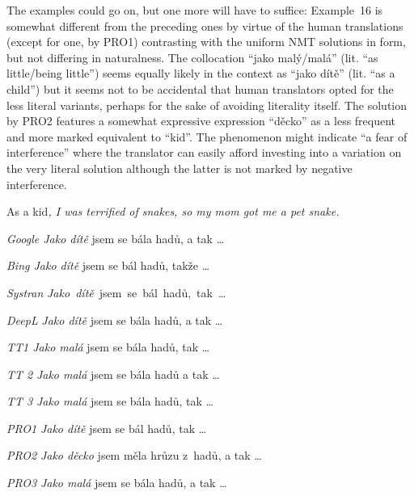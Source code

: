 \documentclass[output=paper]{langscibook}
\begin{document}
\z
The examples could go on, but one more will have to suffice: Example~16 is somewhat different from the preceding ones by virtue of the human translations (except for one, by PRO1) contrasting with the uniform NMT solutions in form, but not differing in naturalness. The collocation “jako malý/malá” (lit. “as little/being little”) seems equally likely in the context as “jako dítě” (lit. “as a child”) but it seems not to be accidental that human translators opted for the less literal variants, perhaps for the sake of avoiding literality itself. The solution by PRO2 features a somewhat expressive expression “děcko” as a less frequent and more marked equivalent to “kid”. The phenomenon might indicate “a fear of interference” where the translator can easily afford investing into a variation on the very literal solution although the latter is not marked by negative interference.

\ea \label{ex:kamenicka:12}

As a kid\textit{, I was terrified of snakes, so my mom got me a pet snake.}

\textit{Google Jako dítě} jsem se bála hadů, a tak …

\textit{Bing Jako dítě} jsem se bál hadů, takže …

\textit{Systran} \textit{Jako~dítě}~jsem~se~bál~hadů,~tak~…

\textit{DeepL} \textit{Jako dítě} jsem se bála hadů, a tak …

\textit{TT1 Jako malá} jsem se bála hadů, tak …

\textit{TT 2} \textit{Jako malá} jsem se bála hadů a tak …

\textit{TT 3} \textit{Jako malá} jsem se bála hadů, tak …

\textit{PRO1} \textit{Jako dítě} jsem se bál hadů, tak …

\textit{PRO2} \textit{Jako děcko} jsem měla hrůzu z~hadů, a tak …

\textit{PRO3} \textit{Jako malá} jsem se bála hadů, a tak …

\z
\end{document}
